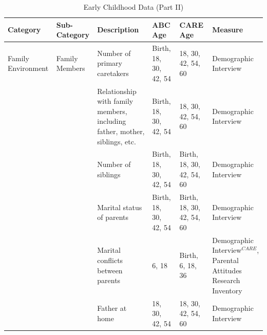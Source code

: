 \documentclass[static]{JJH-Beamer}
\begin{document}
\begin{frame}
 \addtocounter{framenumber}{-1}

\begin{table}[H]
\caption{Early Childhood Data (Part II)}\label{tab:ecvars_2}
\begin{center}
\begin{tiny}
\begin{tabular}{L{1.3cm} C{1.8cm} C{2cm} C{1.3cm} C{1.3cm}  C{2cm}}
\toprule
\textbf{Category}	&	\textbf{Sub-Category}	&	\textbf{Description}	&	\textbf{ABC Age}  	&  \textbf{CARE Age}  & 	\textbf{Measure}	\\ \midrule
Family Environment	&	Family Members	&	Number of primary caretakers	&	Birth, 18, 30, 42, 54	&	18, 30, 42, 54, 60	&	Demographic Interview	\\
	&		&	Relationship with family members, including father, mother, siblings, etc.	&	Birth, 18, 30, 42, 54	&	18, 30, 42, 54, 60	&	Demographic Interview	\\
	&		&	Number of siblings	&	Birth, 18, 30, 42, 54	&	Birth, 18, 30, 42, 54, 60	&	Demographic Interview	\\
	&		&	Marital status of parents	&	Birth, 18, 30, 42, 54	&	Birth, 18, 30, 42, 54, 60	&	Demographic Interview	\\
	&		&	Marital conflicts between parents	&	6, 18	&	Birth, 6, 18, 36	&	Demographic Interview$^{CARE}$, Parental Attitudes Research Inventory	\\
	&		& Father at home & 18, 30, 42, 54  & 18, 30, 42, 54, 60 & Demographic Interview \\
\bottomrule
\end{tabular}
\end{tiny}
\end{center}
\end{table}

\end{frame}
\end{document}
